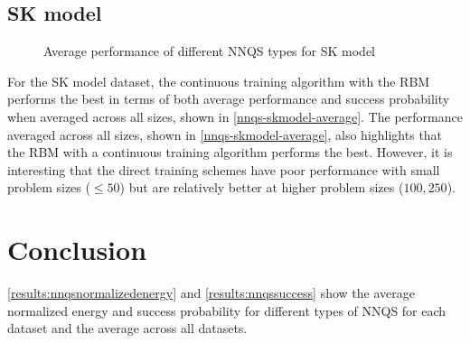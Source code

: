 \subsection{SK model}

\begin{figure}[!htbp]
    \centering
    \hfill
    \caption{Average performance of different NNQS types for SK model}
    \label{nnqs-skmodel-average}
\end{figure}

For the SK model dataset, the continuous training algorithm with the RBM performs the best in terms of both average performance and success probability when averaged across all sizes, shown in \autoref{nnqs-skmodel-average}. The performance averaged across all sizes, shown in \autoref{nnqs-skmodel-average}, also highlights that the RBM with a continuous training algorithm performs the best. However, it is interesting that the direct training schemes have poor performance with small problem sizes ($\leq 50$) but are relatively better at higher problem sizes ($100, 250$).

\section{Conclusion}
\autoref{results:nnqsnormalizedenergy} and \autoref{results:nnqssuccess} show the average normalized energy and success probability for different types of NNQS for each dataset and the average across all datasets.

